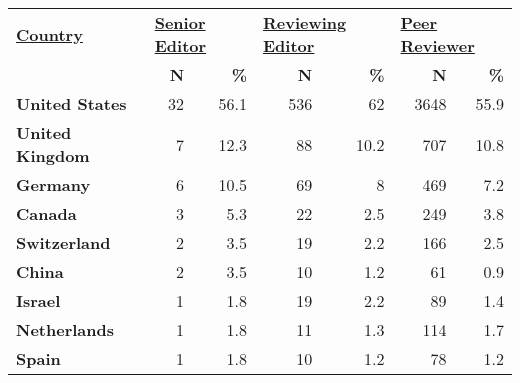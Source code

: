 \documentclass[10pt,letterpaper]{article}
\begin{document}
\begin{table}[!h]
\centering
\begin{tabular}{l|rr|rr|rr}
{\ul \textbf{Country}}  & \multicolumn{2}{l|}{{\ul \textbf{Senior Editor}}} & \multicolumn{2}{l|}{{\ul \textbf{Reviewing Editor}}} & \multicolumn{2}{l|}{{\ul \textbf{Peer Reviewer}}} \\
\textbf{}               & \textbf{N}             & \textbf{\%}             & \textbf{N}               & \textbf{\%}              & \textbf{N}             & \textbf{\%}             \\
\textbf{United States}  & 32                      & 56.1                    & 536                       & 62                       & 3648                    & 55.9                    \\
\textbf{United Kingdom} & 7                       & 12.3                    & 88                        & 10.2                     & 707                     & 10.8                    \\
\textbf{Germany}        & 6                       & 10.5                    & 69                        & 8                        & 469                     & 7.2                     \\
\textbf{Canada}         & 3                       & 5.3                     & 22                        & 2.5                      & 249                     & 3.8                     \\
\textbf{Switzerland}    & 2                       & 3.5                     & 19                        & 2.2                      & 166                     & 2.5                     \\
\textbf{China}          & 2                       & 3.5                     & 10                        & 1.2                      & 61                      & 0.9                     \\
\textbf{Israel}         & 1                       & 1.8                     & 19                        & 2.2                      & 89                      & 1.4                     \\
\textbf{Netherlands}    & 1                       & 1.8                     & 11                        & 1.3                      & 114                     & 1.7                     \\
\textbf{Spain}          & 1                       & 1.8                     & 10                        & 1.2                      & 78                      & 1.2                     \\

\end{tabular}
\end{table}
\end{document}
